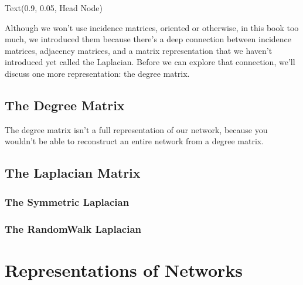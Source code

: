 \documentclass[letterpaper,10pt,english]{jupyterBook}
\begin{document}
\begin{sphinxVerbatim}[commandchars=\\\{\}]
Text(0.9, \PYGZhy{}0.05, \PYGZsq{}Head Node\PYGZsq{})
\end{sphinxVerbatim}

\noindent{}

\sphinxAtStartPar
Although we won’t use incidence matrices, oriented or otherwise, in this book too much, we introduced them because there’s a deep connection between incidence matrices, adjacency matrices, and a matrix representation that we haven’t introduced yet called the Laplacian. Before we can explore that connection, we’ll discuss one more representation: the degree matrix.


\subsection{The Degree Matrix}
\label{\detokenize{representations/ch4/matrix-representations:the-degree-matrix}}
\sphinxAtStartPar
The degree matrix isn’t a full representation of our network, because you wouldn’t be able to reconstruct an entire network from a degree matrix.


\subsection{The Laplacian Matrix}
\label{\detokenize{representations/ch4/matrix-representations:the-laplacian-matrix}}

\subsubsection{The Symmetric Laplacian}
\label{\detokenize{representations/ch4/matrix-representations:the-symmetric-laplacian}}

\subsubsection{The Random\sphinxhyphen{}Walk Laplacian}
\label{\detokenize{representations/ch4/matrix-representations:the-random-walk-laplacian}}

\section{Representations of Networks}
\label{\detokenize{representations/ch4/network-representations:representations-of-networks}}\label{\detokenize{representations/ch4/network-representations::doc}}
\end{document}

